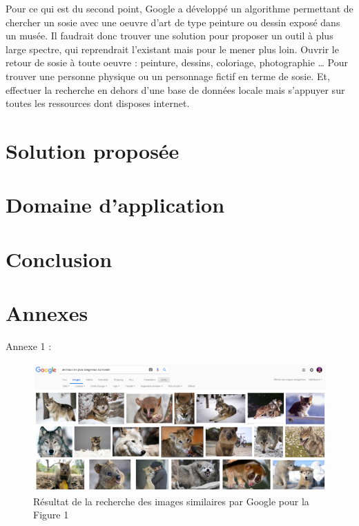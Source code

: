 \documentclass[a4paper,12pt]{article}
\begin{document}
Pour ce qui est du second point, Google a développé un algorithme permettant de chercher un sosie avec une oeuvre d’art de type peinture ou dessin exposé dans un musée. Il faudrait donc trouver une solution pour proposer un outil à plus large spectre, qui reprendrait l’existant mais pour le mener plus loin. 
Ouvrir le retour de sosie à toute oeuvre : peinture, dessins, coloriage, photographie … Pour trouver une personne physique ou un personnage fictif en terme de sosie. Et, effectuer la recherche en dehors d'une base de données locale mais s'appuyer sur toutes les ressources dont disposes internet. 

\section{Solution proposée}
\section{Domaine d'application}
\newpage
{}
\section*{Conclusion}


\newpage



\section{Annexes}
Annexe 1 : 
\begin{figure}[!h]
    \centering
    \includegraphics[scale=0.8]{images/Res2GI.PNG}
    \caption{Résultat de la recherche des images similaires par Google pour la Figure 1}
\end{figure}
\end{document}
